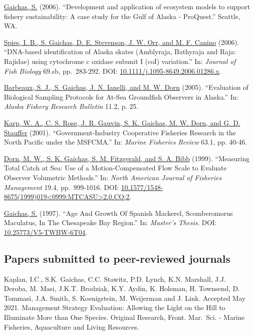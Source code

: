 \documentclass[11pt, a4paper]{awesome-cv}
\begin{document}
\protect\hyperlink{cite-gaichas_development_2006}{Gaichas, S.} (2006).
``Development and application of ecosystem models to support fishery
sustainability: A case study for the Gulf of Alaska - ProQuest.''
Seattle, WA.

\protect\hyperlink{cite-spies_dna-based_2006}{Spies, I. B., S. Gaichas,
D. E. Stevenson, J. W. Orr, and M. F. Canino} (2006). ``DNA-based
identification of Alaska skates (Amblyraja, Bathyraja and Raja: Rajidae)
using cytochrome c oxidase subunit I (coI) variation.'' In:
\emph{Journal of Fish Biology} 69.sb, pp.~283-292. DOI:
\href{https://doi.org/10.1111\%2Fj.1095-8649.2006.01286.x}{10.1111/j.1095-8649.2006.01286.x}.

\protect\hyperlink{cite-barbeaux_evaluation_2005}{Barbeaux, S. J., S.
Gaichas, J. N. Ianelli, and M. W. Dorn} (2005). ``Evaluation of
Biological Sampling Protocols for At-Sea Groundfish Observers in
Alaska.'' In: \emph{Alaska Fishery Research Bulletin} 11.2, p. 25.

\protect\hyperlink{cite-karp_government-industry_2001}{Karp, W. A., C.
S. Rose, J. R. Gauvin, S. K. Gaichas, M. W. Dorn, and G. D. Stauffer}
(2001). ``Government-Industry Cooperative Fisheries Research in the
North Pacific under the MSFCMA.'' In: \emph{Marine Fisheries Review}
63.1, pp. 40-46.

\protect\hyperlink{cite-dorn_measuring_1999}{Dorn, M. W., S. K. Gaichas,
S. M. Fitzgerald, and S. A. Bibb} (1999). ``Measuring Total Catch at
Sea: Use of a Motion-Compensated Flow Scale to Evaluate Observer
Volumetric Methods.'' In: \emph{North American Journal of Fisheries
Management} 19.4, pp.~999-1016. DOI:
\href{https://doi.org/10.1577\%2F1548-8675\%281999\%29019\%3C0999\%3AMTCASU\%3E2.0.CO\%3B2}{10.1577/1548-8675(1999)019\textless0999:MTCASU\textgreater2.0.CO;2}.

\protect\hyperlink{cite-gaichas_age_1997}{Gaichas, S.} (1997). ``Age And
Growth Of Spanish Mackerel, Scomberomorus Maculatus, In The Chesapeake
Bay Region.'' In: \emph{Master's Thesis}. DOI:
\href{https://doi.org/10.25773\%2FV5-TWBW-6T04}{10.25773/V5-TWBW-6T04}.

\hypertarget{papers-submitted-to-peer-reviewed-journals}{%
\subsection{Papers submitted to peer-reviewed
journals}\label{papers-submitted-to-peer-reviewed-journals}}

Kaplan, I.C., S.K. Gaichas, C.C. Stawitz, P.D. Lynch, K.N. Marshall,
J.J. Deroba, M. Masi, J.K.T. Brodziak, K.Y. Aydin, K. Holsman, H.
Townsend, D. Tommasi, J.A. Smith, S. Koenigstein, M. Weijerman and J.
Link. Accepted May 2021. Management Strategy Evaluation: Allowing the
Light on the Hill to Illuminate More than One Species. Original
Research, Front. Mar.~Sci. - Marine Fisheries, Aquaculture and Living
Resources.
\end{document}
